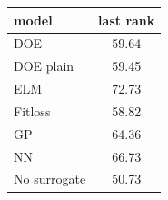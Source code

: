 \begin{tabular}{|lc|}
\hline
model & last rank\\
\hline
DOE & 59.64 \\
DOE plain & 59.45 \\
ELM & 72.73 \\
Fitloss & 58.82 \\
GP & 64.36 \\
NN & 66.73 \\
No surrogate & 50.73 \\
\hline
\end{tabular}
